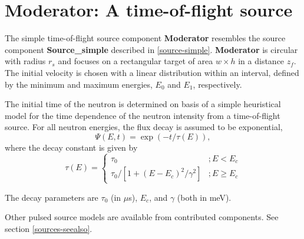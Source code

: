 \section{Moderator: A time-of-flight source}
\label{s:moderator}


The simple time-of-flight source component {\bf Moderator} resembles
the source component {\bf Source\_simple} described in \ref{source-simple}.
{\bf Moderator} is circular with radius $r_s$ and focuses
on a rectangular target of area $w \times h$ in a distance $z_f$. 
The initial velocity is chosen
with a linear distribution within an interval, defined by the
minimum and maximum energies, $E_0$ and $E_1$, respectively.

The initial time of the neutron is determined on basis of a 
simple heuristical model for the time dependence of the
neutron intensity from a time-of-flight source.
For all neutron energies, the flux decay is assumed to be exponential,
\begin{equation}
\Psi(E,t) = \exp(-t/\tau(E)) ,
\end{equation}
where the decay constant is given by
\begin{equation}
\tau(E) = \left\{
\begin{array}{cc}
 \tau_0                               & ; E<E_c \\
 \tau_0 / [ 1 + (E-E_c)^2/\gamma^2 ]  & ; E \geq E_c
\end{array}
\right.
\end{equation}

The decay parameters are
$\tau_0$ (in $\mu$s), $E_c$, and $\gamma$ (both in meV).

Other pulsed source models are available from contributed components. See section \ref{sources-seealso}.